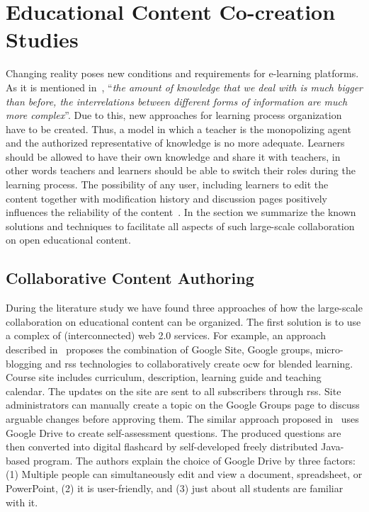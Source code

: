 \documentclass[PhD, Submit, ngerman,UKenglish,table]{scrbook}
\begin{document}
\section{Educational Content Co-creation Studies}
Changing reality poses new conditions and requirements for e-learning platforms.
As it is mentioned in~\cite{DBLP:reference/ai/PedreiraSC09}, ``\emph{the amount of knowledge that we deal with is much bigger than before, the interrelations between different forms of information are much more complex}''.
Due to this, new approaches for learning process organization have to be created.
Thus, a model in which a teacher is the monopolizing agent and the authorized representative of knowledge is no more adequate.
Learners should be allowed to have their own knowledge and share it with teachers, in other words teachers and learners should be able to switch their roles during the learning process.
The possibility of any user, including learners to edit the content together with modification history and discussion pages positively influences the reliability of the content~\cite{Jiake2010}.
In the section we summarize the known solutions and techniques to facilitate all aspects of such large-scale collaboration on open educational content.

\subsection{Collaborative Content Authoring}

During the literature study we have found three approaches of how the large-scale collaboration on educational content can be organized.
The first solution is to use a complex of (interconnected) web 2.0 services.
For example, an approach described in~\cite{Cai2010} proposes the combination of Google Site, Google groups, micro-blogging and \gls{rss} technologies to collaboratively create \gls{ocw} for blended learning.
Course site includes curriculum, description, learning guide and teaching calendar.
The updates on the site are sent to all subscribers through \gls{rss}.
Site administrators can manually create a topic on the Google Groups page to discuss arguable changes before approving them.
The similar approach proposed in~\cite{Bow2013} uses Google Drive to create self-assessment questions.
The produced questions are then converted into digital flashcard by self-developed freely distributed Java-based program.
The authors explain the choice of Google Drive by three factors: (1) Multiple people can simultaneously edit and view a document, spreadsheet, or PowerPoint, (2) it is user-friendly, and (3) just about all students are familiar with it.
\end{document}
